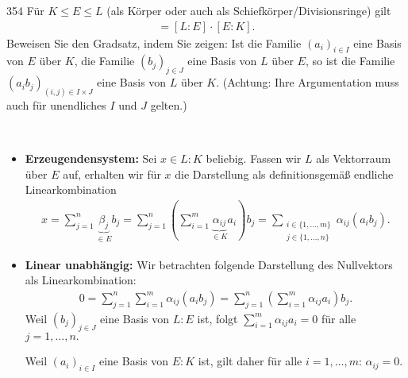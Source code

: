 \begin{algebraUE}{354}
Für $K \leq E \leq L$ (als Körper oder auch als Schiefkörper/Divisionsringe) gilt
\begin{align*}
  [L:K] = [L:E]\cdot[E:K].
\end{align*}
Beweisen Sie den Gradsatz, indem Sie zeigen: Ist die Familie $(a_i)_{i \in I}$
eine Basis von $E$ über $K$, die Familie $(b_j)_{j \in J}$ eine Basis von $L$ über $E$,
so ist die Familie $(a_ib_j)_{(i,j) \in I \times J}$ eine Basis von $L$ über $K$.
(Achtung: Ihre Argumentation muss auch für unendliches $I$ und $J$ gelten.)

\end{algebraUE}

\begin{solution}
\leavevmode \\
  \begin{itemize}
      \item \textbf{Erzeugendensystem:} Sei $x \in L:K$ beliebig. Fassen wir $L$ als Vektorraum über $E$ auf, erhalten wir für $x$
      die Darstellung als definitionsgemäß endliche Linearkombination
  \begin{align*}
      x = \sum_{j=1}^n \underbrace{\beta_j}_{\in E} b_j = \sum_{j=1}^n \left(\sum_{i=1}^m \underbrace{\alpha_{ij}}_{\in K} a_i \right) b_j = \sum_{\substack{i \in \{1, ..., m\} \\ {j\in \{1,...,n\}}}} \alpha_{ij} (a_i b_j).
  \end{align*}
  \item \textbf{Linear unabhängig:} Wir betrachten folgende Darstellung des Nullvektors als Linearkombination:
  \begin{align*}
      0 = \sum_{j=1}^n \sum_{i=1}^m \alpha_{ij} (a_i b_j) = \sum_{j=1}^n \left(\sum_{i=1}^m \alpha_{ij} a_i\right) b_j.
  \end{align*}
  Weil $(b_j)_{j \in J}$ eine Basis von $L:E$ ist, folgt $\sum_{i=1}^m \alpha_{ij} a_i = 0$ für alle $j = 1,\dots,n.$

  Weil $(a_i)_{i \in I}$ eine Basis von $E:K$ ist, gilt daher für alle $i = 1,\dots,m$: $\alpha_{ij} = 0$.
  \end{itemize}
\end{solution}
